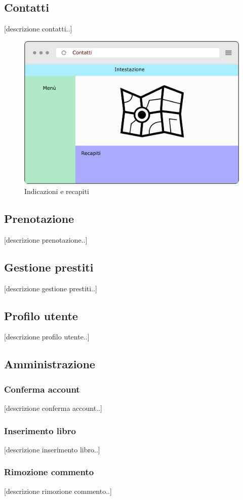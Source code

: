 \subsection{Contatti}
[descrizione contatti..]
\begin{figure}[H]
	\centering
	\includegraphics[width= 14cm]{immagini/contatti.png}
	\caption{Indicazioni e recapiti}
\end{figure}

\subsection{Prenotazione}
[descrizione prenotazione..]

\subsection{Gestione prestiti}
[descrizione gestione prestiti..]

\subsection{Profilo utente}
[descrizione profilo utente..]

\subsection{Amministrazione}
\subsubsection{Conferma account}
[descrizione conferma account..]

\subsubsection{Inserimento libro}
[descrizione inserimento libro..]

\subsubsection{Rimozione commento}
[descrizione rimozione commento..]

